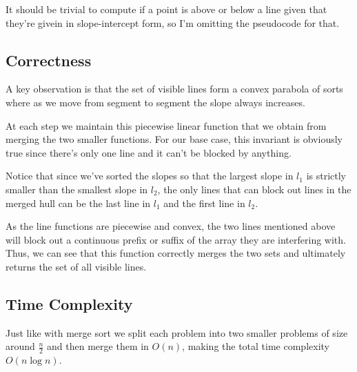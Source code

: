 \documentclass[12pt]{article}
\begin{document}
It should be trivial to compute if a point is above or below a line
given that they're givein in slope-intercept form, so I'm omitting the pseudocode for that.

\pagebreak

\subsection{Correctness}

A key observation is that the set of visible lines form
a convex parabola of sorts where as we move from segment to segment
the slope always increases.

At each step we maintain this piecewise linear function
that we obtain from merging the two smaller functions.
For our base case, this invariant is obviously true
since there's only one line and it can't be blocked by anything.

Notice that since we've sorted the slopes so that the largest slope
in $l_1$ is strictly smaller than the smallest slope in $l_2$,
the only lines that can block out lines in the merged hull
can be the last line in $l_1$ and the first line in $l_2$.

As the line functions are piecewise and convex,
the two lines mentioned above will block out a continuous prefix
or suffix of the array they are interfering with.
Thus, we can see that this function correctly merges
the two sets and ultimately returns the set of all visible lines.

\subsection{Time Complexity}

Just like with merge sort we split each problem
into two smaller problems of size around $\frac{n}{2}$ and then
merge them in $O(n)$, making the total time complexity $\boxed{O(n \log n)}$.
\end{document}

